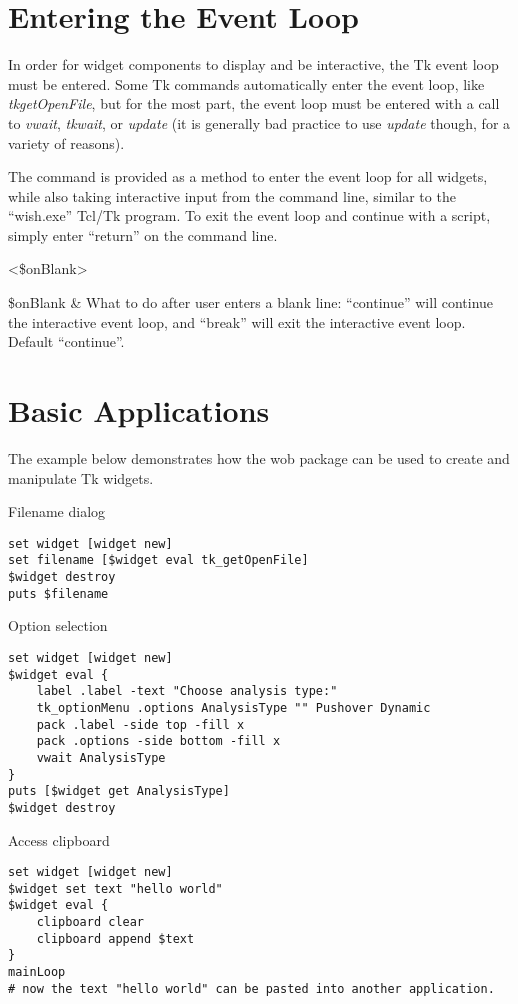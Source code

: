 \documentclass{article}
\renewcommand{\^}[1]{\textsuperscript{#1}}
\renewcommand{\_}[1]{\textsubscript{#1}}
\begin{document}
\section{Entering the Event Loop}
In order for widget components to display and be interactive, the Tk event loop must be entered. 
Some Tk commands automatically enter the event loop, like \textit{tk\textunderscore getOpenFile}, but for the most part, the event loop must be entered with a call to \textit{vwait}, \textit{tkwait}, or \textit{update} (it is generally bad practice to use \textit{update} though, for a variety of reasons). 

The command  is provided as a method to enter the event loop for all widgets, while also taking interactive input from the command line, similar to the ``wish.exe'' Tcl/Tk program.
To exit the event loop and continue with a script, simply enter ``return'' on the command line.
\begin{syntax}
   	 <\$onBlank>
\end{syntax}
\begin{args}
   	\$onBlank & What to do after user enters a blank line: ``continue'' will continue the interactive event loop, and ``break'' will exit the interactive event loop. Default ``continue''.
\end{args}

\clearpage
\section{Basic Applications}
The example below demonstrates how the wob package can be used to create and manipulate Tk widgets.
\begin{example}{Filename dialog}
\begin{lstlisting}
set widget [widget new]
set filename [$widget eval tk_getOpenFile]
$widget destroy
puts $filename
\end{lstlisting}
\end{example}

\begin{example}{Option selection}
\begin{lstlisting}
set widget [widget new]
$widget eval {
	label .label -text "Choose analysis type:"
	tk_optionMenu .options AnalysisType "" Pushover Dynamic
	pack .label -side top -fill x
	pack .options -side bottom -fill x
	vwait AnalysisType
}
puts [$widget get AnalysisType]
$widget destroy
\end{lstlisting}
\end{example}

\begin{example}{Access clipboard}
\begin{lstlisting}
set widget [widget new]
$widget set text "hello world"
$widget eval {
	clipboard clear
	clipboard append $text
}
mainLoop
# now the text "hello world" can be pasted into another application.
\end{lstlisting}
\end{example}
\end{document}
